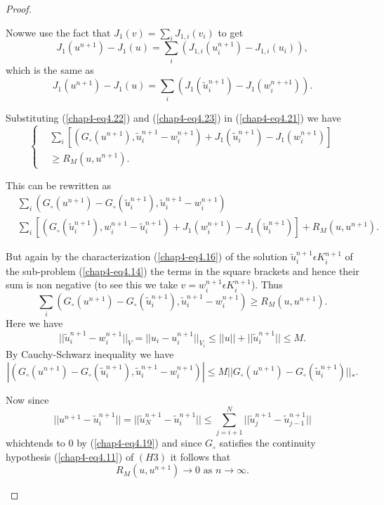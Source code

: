 \begin{proof}
\begin{step}
Now\pageoriginale we use the fact that $J_{1}(v) = \sum_{i} J_{1, i} (v_{i})$ to get
$$
J_{1} (u^{n+1}) - J_{1}(u) = \sum_{i} (J_{1, i}(u_{i}^{n+1}) - J_{1, i} (u_{i})),
$$
which is the same as
\begin{equation*}
J_{1} (u^{n+1}) -J_{1}(u) = \sum_{i} (J_{1}(\widetilde{u}_{i}^{n+1}) - J_{1}(w_{i}^{n++1})).\tag{4.23}\label{chap4-eq4.23}
\end{equation*}

Substituting (\ref{chap4-eq4.22}) and (\ref{chap4-eq4.23}) in (\ref{chap4-eq4.21}) we have
\begin{equation*}
\begin{cases}
& \sum_{i} [(G_{\circ}(u^{n+1}), \widetilde{u}_{i}^{n+1} - w_{i}^{n+1}) + J_{1} (\widetilde{u}_{i}^{n+1}) - J_{1} (w_{i}^{n+1})]\\
& \geq R_{M} (u, u^{n+1}).
\end{cases}
\end{equation*}

This can be rewritten as
\begin{align*}
& \sum_{i} (G_{\circ}(u^{n+1}) - G_{\circ}(\widetilde{u}_{i}^{n+1}), \widetilde{u}_{i}^{n+1} - w_{i}^{n+1})\\
& \sum_{i} [(G_{\circ} (\widetilde{u}_{i}^{n+1}), w_{i}^{n+1} - \widetilde{u}_{i}^{n+1}) + J_{1}(w_{i}^{n+1})- J_{1} (\widetilde{u}_{i}^{n+1})] + R_{M} (u, u^{n+1}).
\end{align*}

But again by the characterization (\ref{chap4-eq4.16}) of the solution $\widetilde{u}_{i}^{n+1} \epsilon K_{i}^{n+1}$ of the sub-problem (\ref{chap4-eq4.14}) the terms in the square brackets and hence their sum is non negative (to see this we take $v = w_{i}^{n+1} \epsilon K_{i}^{n+1}$). Thus
\begin{equation*}
\sum_{i} (G_{\circ} (u^{n+1}) - G_{\circ} (\widetilde{u}_{i}^{n+1}), \widetilde{u}_{i}^{n+1} - w_{i}^{n+1}) \geq R_{M} (u, u^{n+1}).\tag{4.24}\label{chap4-eq4.24}
\end{equation*}
Here we have
$$
||\widetilde{u}^{n+1}_i - w^{n+1}_i ||_V = ||u_i - u^{n+1}_i||_{V_i} \leq || u|| + || \widetilde{u}_i^{n+1}|| \leq M. 
$$
By Cauchy-Schwarz inequality we have
$$
|(G_{\circ} (u^{n+1}) - G_{\circ}(\widetilde{u}_{i}^{n+1}), \widetilde{u}_{i}^{n+1} - w_{i}^{n+1})| \leq M || G_{\circ} (u^{n+1}) - G_{\circ} (\widetilde{u}_{i}^{n+1})||_*.
$$ 

Now since
$$
|| u^{n+1} - \widetilde{u}_{i}^{n+1} || = || \widetilde{u}_{N}^{n+1} - \widetilde{u}_{i}^{n+1} || \leq \sum_{j=i+1}^{N} || \widetilde{u}_{j}^{n+1} - \widetilde{u}_{j-1}^{n+1} ||
$$
which\pageoriginale tends to 0 by (\ref{chap4-eq4.19}) and since $G_{\circ}$ satisfies the continuity hypothesis (\ref{chap4-eq4.11}) of $(H3)$ it follows that
$$
R_{M} (u, u^{n+1}) \to 0 \text{ as } n \to \infty.
$$


\end{step}
\end{proof}
